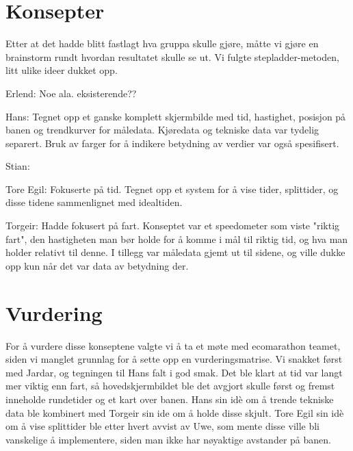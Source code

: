 \section{Konsepter}
Etter at det hadde blitt fastlagt hva gruppa skulle gjøre, måtte vi gjøre en
brainstorm rundt hvordan resultatet skulle se ut. Vi fulgte stepladder-metoden,
litt ulike ideer dukket opp.

Erlend:
Noe ala. eksisterende??

Hans:
Tegnet opp et ganske komplett skjermbilde med tid, hastighet, posisjon på banen
og trendkurver for måledata. Kjøredata og tekniske data var tydelig separert.
Bruk av farger for å indikere betydning av verdier var også spesifisert.

Stian:

Tore Egil:
Fokuserte på tid. Tegnet opp et system for å vise tider, splittider, og disse
tidene sammenlignet med idealtiden.

Torgeir:
Hadde fokusert på fart. Konseptet var et speedometer som viste "riktig fart", 
den hastigheten man bør holde for å komme i mål til riktig tid, og hva man
holder relativt til denne. I tillegg var måledata gjemt ut til sidene, og
ville dukke opp kun når det var data av betydning der.


\section{Vurdering}
For å vurdere disse konseptene valgte vi å ta et møte med ecomarathon teamet,
siden vi manglet grunnlag for å sette opp en vurderingsmatrise. Vi snakket
først med Jardar, og tegningen til Hans falt i god smak. Det ble klart at tid
var langt mer viktig enn fart, så hovedskjermbildet ble det avgjort skulle først
og fremst inneholde rundetider og et kart over banen. Hans sin idè om å trende
tekniske data ble kombinert med Torgeir sin ide om å holde disse skjult. 
Tore Egil sin idè om å vise splittider ble etter hvert avvist av Uwe, som mente
disse ville bli vanskelige å implementere, siden man ikke har nøyaktige
avstander på banen.

